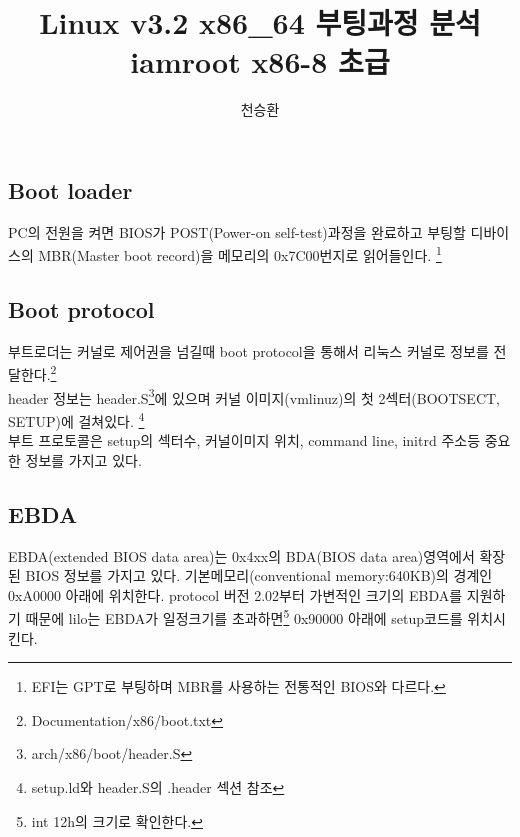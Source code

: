 \documentclass[a4paper,11pt]{report}
\begin{document}
\begin{CJK}{UTF8}{}

\title{Linux v3.2 x86\_64 부팅과정 분석\\
iamroot x86-8 초급\\}
\author{
\and{천승환 }
}
\date{}


\maketitle

\chapter{Boot loader}
PC의 전원을 켜면 BIOS가 POST(Power-on self-test)과정을 완료하고 부팅할 디바이스의 MBR(Master boot record)을 메모리의 0x7C00번지로 읽어들인다.
\footnote{EFI는 GPT로 부팅하며 MBR를 사용하는 전통적인 BIOS와 다르다.}

\section{Boot protocol}
부트로더는 커널로 제어권을 넘길때 boot protocol을 통해서 리눅스 커널로 정보를 전달한다.\footnote{Documentation/x86/boot.txt}\\
header 정보는 header.S\footnote{arch/x86/boot/header.S}에 있으며 커널 이미지(vmlinuz)의 첫 2섹터(BOOTSECT, SETUP)에 걸쳐있다. \footnote{setup.ld와 header.S의 .header 섹션 참조}\\
부트 프로토콜은 setup의 섹터수, 커널이미지 위치, command line, initrd 주소등 중요한 정보를 가지고 있다.

\section{EBDA}
EBDA(extended BIOS data area)는 0x4xx의 BDA(BIOS data area)영역에서 확장된 BIOS 정보를 가지고 있다. 기본메모리(conventional memory:640KB)의 경계인 0xA0000 아래에 위치한다.
protocol 버전 2.02부터 가변적인 크기의 EBDA를 지원하기 때문에 lilo는 EBDA가 일정크기를 초과하면\footnote{int 12h의 크기로 확인한다.} 0x90000 아래에 setup코드를 위치시킨다.


\end{CJK}
\end{document}

